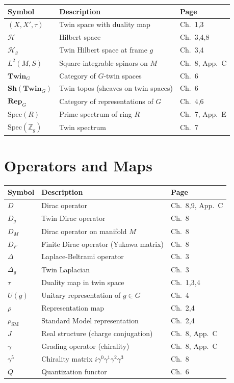\documentclass[11pt,a4paper,openright]{book}
\theoremstyle{plain}
\theoremstyle{definition}
\begin{document}
\begin{tabular}{lll}
\textbf{Symbol} & \textbf{Description} & \textbf{Page} \\
\hline
$(X, X', \tau)$ & Twin space with duality map & Ch.~1,3 \\
$\mathcal{H}$ & Hilbert space & Ch.~3,4,8 \\
$\mathcal{H}_g$ & Twin Hilbert space at frame $g$ & Ch.~3,4 \\
$L^2(M, S)$ & Square-integrable spinors on $M$ & Ch.~8, App.~C \\
$\mathbf{Twin}_G$ & Category of $G$-twin spaces & Ch.~6 \\
$\mathbf{Sh}(\mathbf{Twin}_G)$ & Twin topos (sheaves on twin spaces) & Ch.~6 \\
$\mathbf{Rep}_G$ & Category of representations of $G$ & Ch.~4,6 \\
$\mathrm{Spec}(R)$ & Prime spectrum of ring $R$ & Ch.~7, App.~E \\
$\mathrm{Spec}(\mathbb{Z}_g)$ & Twin spectrum & Ch.~7 \\
\end{tabular}

\section*{Operators and Maps}

\begin{tabular}{lll}
\textbf{Symbol} & \textbf{Description} & \textbf{Page} \\
\hline
$D$ & Dirac operator & Ch.~8,9, App.~C \\
$D_g$ & Twin Dirac operator & Ch.~8 \\
$D_M$ & Dirac operator on manifold $M$ & Ch.~8 \\
$D_F$ & Finite Dirac operator (Yukawa matrix) & Ch.~8 \\
$\Delta$ & Laplace-Beltrami operator & Ch.~3 \\
$\Delta_g$ & Twin Laplacian & Ch.~3 \\
$\tau$ & Duality map in twin space & Ch.~1,3,4 \\
$U(g)$ & Unitary representation of $g \in G$ & Ch.~4 \\
$\rho$ & Representation map & Ch.~2,4 \\
$\rho_{\mathrm{SM}}$ & Standard Model representation & Ch.~2,4 \\
$J$ & Real structure (charge conjugation) & Ch.~8, App.~C \\
$\gamma$ & Grading operator (chirality) & Ch.~8, App.~C \\
$\gamma^5$ & Chirality matrix $i\gamma^0\gamma^1\gamma^2\gamma^3$ & Ch.~8 \\
$Q$ & Quantization functor & Ch.~6 \\
\end{tabular}
\end{document}
